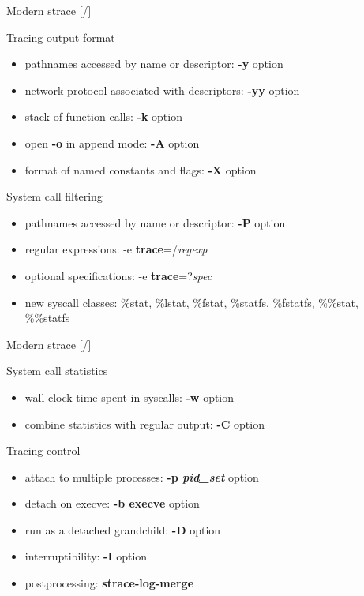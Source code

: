 \documentclass[unicode,aspectratio=169]{beamer}
\begin{document}
\begin{frame}{Modern strace \hfill [\insertframenumber/\inserttotalframenumber]}
\begin{block}{\large Tracing output format}
\begin{itemize}
\item pathnames accessed by name or descriptor: \textbf{-y} option
\item network protocol associated with descriptors: \textbf{-yy} option
\item stack of function calls: \textbf{-k} option
\item open \textbf{-o} in append mode: \textbf{-A} option
\item format of named constants and flags: \textbf{-X} option
\end{itemize}
\end{block}

\begin{block}{\large System call filtering}
\begin{itemize}
\item pathnames accessed by name or descriptor: \textbf{-P} option
\item regular expressions: -e \textbf{trace}=/\textit{regexp}
\item optional specifications: -e \textbf{trace}=?\textit{spec}
\item new syscall classes: \%stat, \%lstat, \%fstat, \%statfs, \%fstatfs, \%\%stat, \%\%statfs
\end{itemize}
\end{block}
\end{frame}

\begin{frame}{Modern strace \hfill [\insertframenumber/\inserttotalframenumber]}
\begin{block}{\large System call statistics}
\begin{itemize}
\item wall clock time spent in syscalls: \textbf{-w} option
\item combine statistics with regular output: \textbf{-C} option
\end{itemize}
\end{block}

\begin{block}{\large Tracing control}
\begin{itemize}
\item attach to multiple processes: \textbf{-p \textit{pid\_set}} option
\item detach on execve: \textbf{-b execve} option
\item run as a detached grandchild: \textbf{-D} option
\item interruptibility: \textbf{-I} option
\item postprocessing: \textbf{strace-log-merge}
\end{itemize}
\end{block}
\end{frame}
\end{document}

